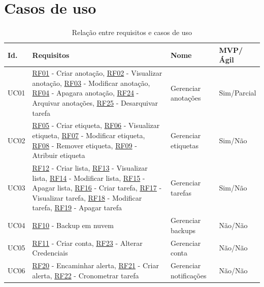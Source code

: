 \documentclass[
	12pt,				%
	oneside,			%
	a4paper,			%
	english,			%
	brazil,				%
	]{abntex2}
\begin{document}
\section{Casos de uso}

\IBGEtabfontsize
\begin{longtable}{@{}lp{}ll@{}}
\caption{Relação entre requisitos e casos de uso}
\label{tab:requisitos_x_casos_de_uso} \\
\toprule
\textbf{Id.} & \textbf{Requisitos} & \textbf{Nome} &\textbf{MVP/Ágil}\\ \midrule
UC01 & \hyperref[RF01]{RF01} - Criar anotação, \hyperref[RF02]{RF02} - Visualizar anotação, \hyperref[RF03]{RF03} - Modificar anotação, \hyperref[RF04]{RF04} - Apagara anotação, \hyperref[RF24]{RF24} - Arquivar anotações, \hyperref[RF25]{RF25} - Desarquivar tarefa & Gerenciar anotações & Sim/Parcial \\ \midrule
UC02 & \hyperref[RF05]{RF05} - Criar etiqueta, \hyperref[RF06]{RF06} - Visualizar etiqueta, \hyperref[RF07]{RF07} - Modificar etiqueta, \hyperref[RF08]{RF08} - Remover etiqueta, \hyperref[RF09]{RF09} - Atribuir etiqueta & Gerenciar etiquetas & Sim/Não \\ \midrule
UC03 & \hyperref[RF12]{RF12} - Criar lista, \hyperref[RF13]{RF13} - Visualizar lista, \hyperref[RF14]{RF14} - Modificar lista, \hyperref[RF15]{RF15} - Apagar lista, \hyperref[RF16]{RF16} - Criar tarefa, \hyperref[RF17]{RF17} - Visualizar tarefa, \hyperref[RF18]{RF18} - Modificar tarefa, \hyperref[RF19]{RF19} - Apagar tarefa & Gerenciar tarefas & Sim/Não\\ \midrule
UC04 & \hyperref[RF10]{RF10} - Backup em nuvem & Gerenciar backups & Não/Não\\ \midrule
UC05 & \hyperref[RF11]{RF11} - Criar conta, \hyperref[RF23]{RF23} - Alterar Credenciais & Gerenciar conta & Não/Não\\ \midrule
UC06 & \hyperref[RF20]{RF20} - Encaminhar alerta, \hyperref[RF21]{RF21} - Criar alerta, \hyperref[RF22]{RF22} - Cronometrar tarefa & Gerenciar notificações & Não/Não\\ \bottomrule
\end{longtable}
\end{document}
